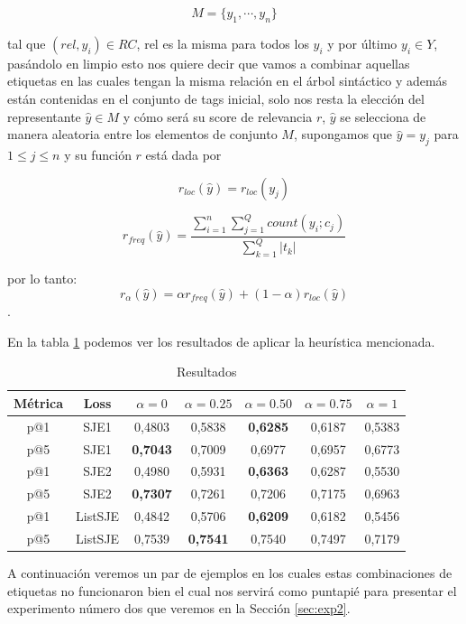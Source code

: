 \[ M = \{y_{1}, \cdots , y_{n}\}\]

tal que $(rel, y_{i}) \in RC$, rel es la misma para todos los $y_{i}$ y por último $y_{i} \in Y$, pasándolo en limpio esto nos quiere decir que vamos a combinar aquellas etiquetas en las cuales tengan la misma relación en el árbol sintáctico y además están contenidas en el conjunto de tags inicial, solo nos resta la elección del representante $\hat{y} \in M $ y cómo será su score de relevancia $r$, $\hat{y}$ se selecciona de manera aleatoria entre los elementos de conjunto $M$, supongamos que $\hat{y}= y_{j}$ para $1 \leqslant j \leqslant n$ y su función $r$ está dada por 

\[r_{loc}(\hat{y}) = r_{loc}(y_{j})\]

\[ r_{freq}(\hat{y}) = \frac{ \sum_{i=1}^{n} \sum_{j=1}^{Q} count(y_{i}; c_{j})} { \sum_{k=1}^{Q} |t_{k}|} \]

por lo tanto:
\[r_{\alpha}(\hat{y}) = \alpha r_{freq}(\hat{y})+ (1 - \alpha) r_{loc}(\hat{y})\].

En la tabla \ref{tab:results_exp1} podemos ver los resultados de aplicar la heurística mencionada.

\begin{table}[ht]
    \centering
    \begin{tabular}{|c|c|c|c|c|c|c|}
        \hline
        \textbf{Métrica} &
        \textbf{Loss} &
        \textbf{$\alpha = 0$} &
        \textbf{$\alpha = 0.25$} &
        \textbf{$\alpha = 0.50$} &
        \textbf{$\alpha = 0.75$} &
        \textbf{$\alpha = 1$}\\
        \hline \hline
        p@1 & SJE1 & 0,4803 & 0,5838 & \textbf{0,6285} & 0,6187 & 0,5383 \\
        p@5 & SJE1 & \textbf{0,7043} & 0,7009 & 0,6977 & 0,6957 & 0,6773 \\
        p@1 & SJE2 & 0,4980 & 0,5931 & \textbf{0,6363} & 0,6287 & 0,5530 \\
        p@5 & SJE2 & \textbf{0,7307} & 0,7261 & 0,7206 & 0,7175 & 0,6963 \\
        p@1 & ListSJE & 0,4842 & 0,5706 & \textbf{0,6209} & 0,6182 & 0,5456 \\
        p@5 & ListSJE & 0,7539 & \textbf{0,7541} & 0,7540 & 0,7497 & 0,7179 \\
        \hline
    \end{tabular}
    \caption{Resultados}
    \label{tab:results_exp1}
\end{table}

A continuación veremos un par de ejemplos en los cuales estas combinaciones de etiquetas no funcionaron bien el cual nos servirá como puntapié para presentar el experimento número dos que veremos en la Sección \ref{sec:exp2}.


